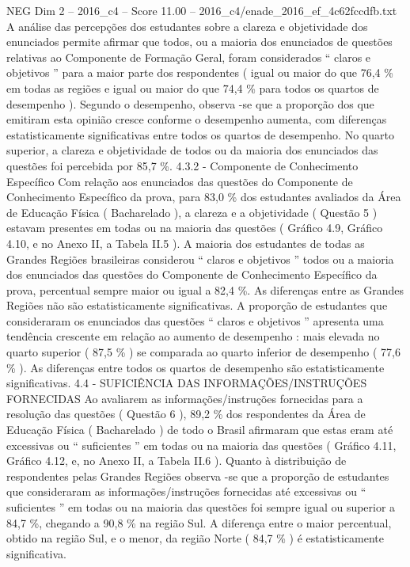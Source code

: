 \begin{textsample}{NEG Dim 2 – 2016\_c4 – Score 11.00 – 2016\_c4/enade\_2016\_ef\_4c62fccdfb.txt}
A análise das percepções dos estudantes sobre a clareza e objetividade dos enunciados permite afirmar que todos, ou a maioria dos enunciados de questões relativas ao Componente de Formação Geral, foram considerados “ claros e objetivos ” para a maior parte dos respondentes ( igual ou maior do que 76,4 \% em todas as regiões e igual ou maior do que 74,4 \% para todos os quartos de desempenho ).
Segundo o desempenho, observa -se que a proporção dos que emitiram esta opinião cresce conforme o desempenho aumenta, com diferenças estatisticamente significativas entre todos os quartos de desempenho.
No quarto superior, a clareza e objetividade de todos ou da maioria dos enunciados das questões foi percebida por 85,7 \%. 4.3.2 - Componente de Conhecimento Específico Com relação aos enunciados das questões do Componente de Conhecimento Específico da prova, para 83,0 \% dos estudantes avaliados da Área de Educação Física ( Bacharelado ), a clareza e a objetividade ( Questão 5 ) estavam presentes em todas ou na maioria das questões ( Gráfico 4.9, Gráfico 4.10, e no Anexo II, a Tabela II.5 ).
A maioria dos estudantes de todas as Grandes Regiões brasileiras considerou “ claros e objetivos ” todos ou a maioria dos enunciados das questões do Componente de Conhecimento Específico da prova, percentual sempre maior ou igual a 82,4 \%.
As diferenças entre as Grandes Regiões não são estatisticamente significativas.
A proporção de estudantes que consideraram os enunciados das questões “ claros e objetivos ” apresenta uma tendência crescente em relação ao aumento de desempenho : mais elevada no quarto superior ( 87,5 \% ) se comparada ao quarto inferior de desempenho ( 77,6 \% ).
As diferenças entre todos os quartos de desempenho são estatisticamente significativas. 4.4 - SUFICIÊNCIA DAS INFORMAÇÕES/INSTRUÇÕES FORNECIDAS Ao avaliarem as informações/instruções fornecidas para a resolução das questões ( Questão 6 ), 89,2 \% dos respondentes da Área de Educação Física ( Bacharelado ) de todo o Brasil afirmaram que estas eram até excessivas ou “ suficientes ” em todas ou na maioria das questões ( Gráfico 4.11, Gráfico 4.12, e, no Anexo II, a Tabela II.6 ).
Quanto à distribuição de respondentes pelas Grandes Regiões observa -se que a proporção de estudantes que consideraram as informações/instruções fornecidas até excessivas ou “ suficientes ” em todas ou na maioria das questões foi sempre igual ou superior a 84,7 \%, chegando a 90,8 \% na região Sul.
A diferença entre o maior percentual, obtido na região Sul, e o menor, da região Norte ( 84,7 \% ) é estatisticamente significativa.

\end{textsample}
